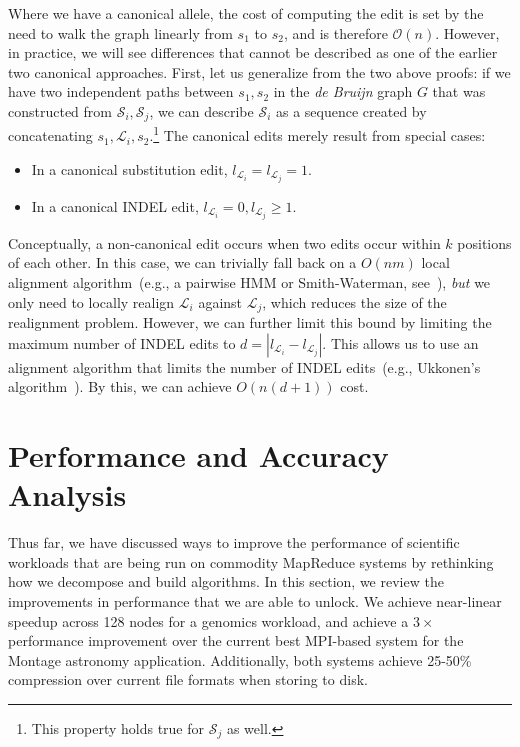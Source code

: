 \documentclass[masters]{ucbthesis}
\begin{document}
Where we have a canonical allele, the cost of computing the edit is set by the need to walk the graph
linearly from $s_1$ to $s_2$, and is therefore $\mathcal{O}(n)$. However, in practice, we will see
differences that cannot be described as one of the earlier two canonical approaches. First, let us
generalize from the two above proofs: if we have two independent paths between $s_1, s_2$ in the
\emph{de Bruijn} graph $G$ that was constructed from $\mathcal{S}_i, \mathcal{S}_j$, we can describe
$\mathcal{S}_i$ as a sequence created by concatenating $s_1, \mathcal{L}_i, s_2$.\footnote{This
property holds true for $\mathcal{S}_j$ as well.} The canonical edits merely result from special cases:

\begin{itemize}
\item In a canonical substitution edit, $l_{\mathcal{L}_i} = l_{\mathcal{L}_j} = 1$.
\item In a canonical INDEL edit, $l_{\mathcal{L}_i} = 0, l_{\mathcal{L}_j} \ge 1$.
\end{itemize}

Conceptually, a non-canonical edit occurs when two edits occur within $k$ positions of each other. In
this case, we can trivially fall back on a $O(nm)$ local alignment algorithm~(e.g., a pairwise HMM or
Smith-Waterman, see~\cite{durbin98,smith81}), \emph{but} we only need to locally realign
$\mathcal{L}_i$ against $\mathcal{L}_j$, which reduces the size of the realignment problem. However, we
can further limit this bound by limiting the maximum number of INDEL edits to $d = | l_{\mathcal{L}_i} -
l_{\mathcal{L}_j} |$. This allows us to use an alignment algorithm that limits the number of INDEL
edits~(e.g., Ukkonen's algorithm~\cite{ukkonen85}). By this, we can achieve $O(n(d + 1))$ cost.

\chapter{Performance and Accuracy Analysis}

Thus far, we have discussed ways to improve the performance of scientific workloads that are
being run on commodity MapReduce systems by rethinking how we decompose and build algorithms.
In this section, we review the improvements in performance that we are able to unlock. We achieve
near-linear speedup across 128 nodes for a genomics workload, and achieve a $3\times$ performance
improvement over the current best MPI-based system for the Montage astronomy application.
Additionally, both systems achieve 25-50\% compression over current file formats when storing to disk.
\end{document}
